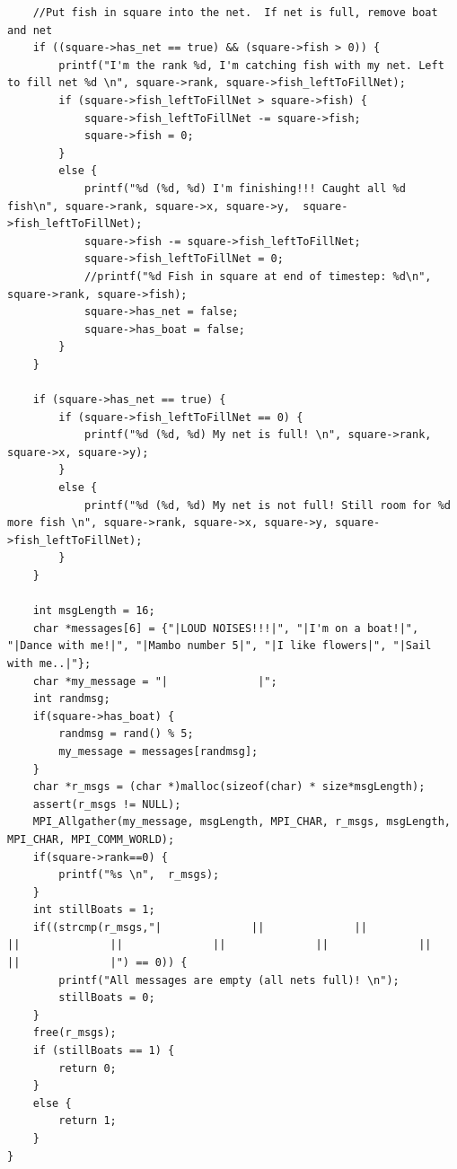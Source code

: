 \documentclass{article}
\begin{document}
\begin{lstlisting}
	//Put fish in square into the net.  If net is full, remove boat and net
	if ((square->has_net == true) && (square->fish > 0)) {
		printf("I'm the rank %d, I'm catching fish with my net. Left to fill net %d \n", square->rank, square->fish_leftToFillNet);
		if (square->fish_leftToFillNet > square->fish) {
			square->fish_leftToFillNet -= square->fish;
			square->fish = 0;
		}
		else {
			printf("%d (%d, %d) I'm finishing!!! Caught all %d fish\n", square->rank, square->x, square->y,  square->fish_leftToFillNet);
			square->fish -= square->fish_leftToFillNet;
			square->fish_leftToFillNet = 0;
			//printf("%d Fish in square at end of timestep: %d\n", square->rank, square->fish);
			square->has_net = false;
			square->has_boat = false;
		}
	}
	
	if (square->has_net == true) {
		if (square->fish_leftToFillNet == 0) {
			printf("%d (%d, %d) My net is full! \n", square->rank, square->x, square->y);
		}
		else {
			printf("%d (%d, %d) My net is not full! Still room for %d more fish \n", square->rank, square->x, square->y, square->fish_leftToFillNet);
		}
	}
	
	int msgLength = 16;
	char *messages[6] = {"|LOUD NOISES!!!|", "|I'm on a boat!|", "|Dance with me!|", "|Mambo number 5|", "|I like flowers|", "|Sail with me..|"};
	char *my_message = "|              |";
	int randmsg;
	if(square->has_boat) {
		randmsg = rand() % 5;
		my_message = messages[randmsg];
	}
	char *r_msgs = (char *)malloc(sizeof(char) * size*msgLength);
	assert(r_msgs != NULL);
	MPI_Allgather(my_message, msgLength, MPI_CHAR, r_msgs, msgLength, MPI_CHAR, MPI_COMM_WORLD);
	if(square->rank==0) {
		printf("%s \n",  r_msgs);
	}
	int stillBoats = 1;
	if((strcmp(r_msgs,"|              ||              ||              ||              ||              ||              ||              ||              ||              |") == 0)) {
		printf("All messages are empty (all nets full)! \n");
		stillBoats = 0;
	}
	free(r_msgs);
	if (stillBoats == 1) {
		return 0;
	}
	else {
		return 1;
	}
}
\end{lstlisting}
\end{document}
